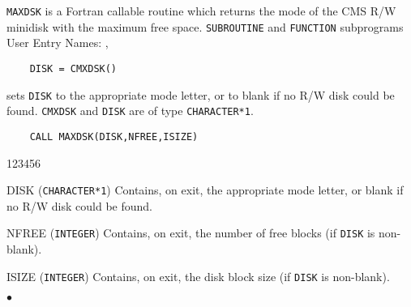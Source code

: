                        
                  
\Submitter{}                
{\tt MAXDSK} is a Fortran callable routine which returns the
mode of the CMS R/W minidisk with the maximum free space.
\Structure
{\tt SUBROUTINE} and {\tt FUNCTION} subprograms \\
User Entry Names: , 
\Usage
\begin{verbatim}
    DISK = CMXDSK()
\end{verbatim}
sets {\tt DISK} to the appropriate mode letter, or to blank if no R/W
disk could be found. {\tt CMXDSK} and {\tt DISK} are of type
{\tt CHARACTER*1}.
\begin{verbatim}
    CALL MAXDSK(DISK,NFREE,ISIZE)
\end{verbatim}
\begin{DLtt}{123456}
\item[DISK] ({\tt CHARACTER*1}) Contains, on exit, the appropriate mode
letter, or blank if no R/W disk could be found.
\item[NFREE] ({\tt INTEGER}) Contains, on exit, the number of free blocks
(if {\tt DISK} is non-blank).
\item[ISIZE] ({\tt INTEGER}) Contains, on exit, the disk block size
(if {\tt DISK} is non-blank).
\end{DLtt}
$\bullet$
